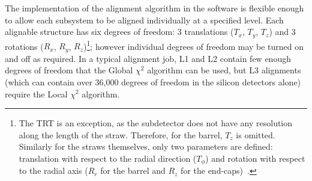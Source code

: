 The implementation of the alignment algorithm in the software is flexible enough to allow each subsystem to be aligned individually at a specified level.
Each alignable structure has six degrees of freedom: 3 translations ($T_x$, $T_y$, $T_z$) and 3 rotations ($R_x$, $R_y$, $R_z$)\footnote{The TRT is an exception, as the subdetector does not have any resolution along the length of the straw.  Therefore, for the barrel, $T_z$ is omitted.  Similarly for the straws themselves, only two parameters are defined: translation with respect to the radial direction ($T_\phi$) and rotation with respect to the radial axis ($R_r$ for the barrel and $R_z$ for the end-caps)~\cite{2012.johnda-thesis}.}; however individual degrees of freedom may be turned on and off as required.
In a typical alignment job, L1 and L2 contain few enough degrees of freedom that the Global $\chi^2$ algorithm can be used, but L3 alignments (which can contain over 36,000 degrees of freedom in the silicon detectors alone) require the Local $\chi^2$ algorithm.

